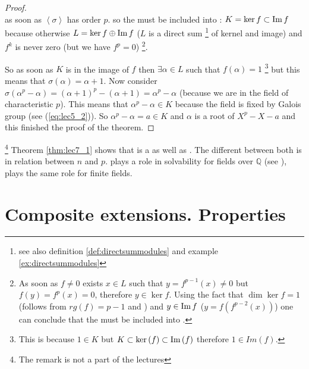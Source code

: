 \begin{theorem}
\begin{proof}
{\[      \]
      as soon as $\left<\sigma\right>$ has order $p$.      
    }
    so the  must
    be included into :
    $K = \ker f \subset \operatorname{Im} f$
    because otherwise $L = \ker f \oplus \operatorname{Im} f$ ($L$ is a
    direct sum
    \footnote{
      see also definition \ref{def:directsummodules} and example
      \ref{ex:directsummodules} 
    }
    of 
    kernel and image) and $f^k$ is never zero (but we have $f^p = 0$)
    \footnote{
      As soon as $f \ne 0$ exists $x \in L$ such that
      $y = f^{p-1}\left(x\right) \ne 0$ but
      $f\left(y\right) = f^p\left(x\right) = 0$,
      therefore $y \in \ker f$. Using the fact that $\dim{\ker f} = 1$
      (follows from $rg(f) = p - 1$ and ) and
      $y \in \operatorname{Im} f$ ($y = f\left(f^{p-2}\left(x\right)\right)$) one
      can conclude that  the  must
      be included into .
    }.

    So as soon as $K$ is in the image of $f$ then $\exists \alpha \in L$
    such that $f\left(\alpha\right) = 1$
    \footnote{
      This is because $1 \in K$ but
      $K \subset \ker\left(f\right) \subset \operatorname{Im}\left(f\right)$ therefore
      $1 \in Im\left(f\right)$.
    }
    but this means that
    $\sigma\left(\alpha\right) = \alpha + 1$. Now consider
    $\sigma\left(\alpha^p - \alpha\right) =
    \left(\alpha + 1\right)^p - \left(\alpha + 1\right) = \alpha^p -
    \alpha$ (because we are in the field of characteristic $p$). This
    means that $\alpha^p - \alpha \in K$ because the field is fixed by
    Galois group (see (\ref{eq:lec5_2})). So
    $\alpha^p - \alpha =  a \in K$ and $\alpha$ is a root of $X^p - X
    - a$ and this finished the proof of the theorem.
  \end{proof}
\end{theorem}


\begin{remark}
  \footnote{
    The remark is not a part of the lectures
  }
  Theorem \ref{thm:lec7_1} shows that
   is a
   as well as
  . The different between both is in
  relation  between $n$ and $p$.  
  plays a role in solvability for fields over
  $\mathbb{Q}$ (see ),
   plays the same 
  role for finite fields.
\end{remark}

\section{Composite extensions. Properties}

